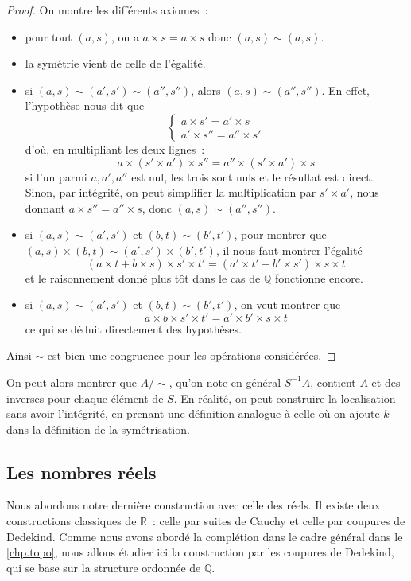 \begin{proof}
  On montre les différents axiomes~:
  \begin{itemize}
  \item pour tout $(a,s)$, on a $a\times s = a \times s$ donc $(a,s)\sim(a,s)$.
  \item la symétrie vient de celle de l'égalité.
  \item si $(a,s)\sim(a',s')\sim(a'',s'')$, alors $(a,s)\sim(a'',s'')$. En
    effet, l'hypothèse nous dit que
    \[\left\{\begin{array}{l}
    a \times s' = a' \times s\\
    a' \times s'' = a'' \times s'
    \end{array}\right.\]
    d'où, en multipliant les deux lignes~:
    \[a\times (s'\times a') \times s'' = a''\times (s'\times a') \times s\]
    si l'un parmi $a,a',a''$ est nul, les trois sont nuls et le résultat est
    direct. Sinon, par intégrité, on peut simplifier la multiplication par
    $s'\times a'$, nous donnant $a\times s'' = a'' \times s$, donc
    $(a,s) \sim (a'',s'')$.
  \item si $(a,s)\sim(a',s')$ et $(b,t)\sim(b',t')$, pour montrer que
    $(a,s)\times(b,t)\sim (a',s')\times (b',t')$, il nous faut montrer
    l'égalité
    \[(a\times t + b \times s)\times s' \times t' =
    (a'\times t' + b' \times s')\times s \times t\]
    et le raisonnement donné plus tôt dans le cas de $\mathbb Q$ fonctionne
    encore.
  \item si $(a,s)\sim(a',s')$ et $(b,t)\sim(b',t')$, on veut montrer que
    \[a\times b \times s' \times t' = a' \times b' \times s \times t\]
    ce qui se déduit directement des hypothèses.
  \end{itemize}
  Ainsi $\sim$ est bien une congruence pour les opérations considérées.
\end{proof}

On peut alors montrer que $A/\sim$, qu'on note en général $S^{-1}A$, contient
$A$ et des inverses pour chaque élément de $S$. En réalité, on peut construire
la localisation sans avoir l'intégrité, en prenant une définition analogue à
celle où on ajoute $k$ dans la définition de la symétrisation.

\subsection{Les nombres réels}

Nous abordons notre dernière construction avec celle des réels. Il existe deux
constructions classiques de $\mathbb R$~: celle par suites de Cauchy et celle
par coupures de Dedekind. Comme nous avons abordé la complétion dans le cadre
général dans le \cref{chp.topo}, nous allons étudier ici la construction par
les coupures de Dedekind, qui se base sur la structure ordonnée de $\mathbb Q$.

